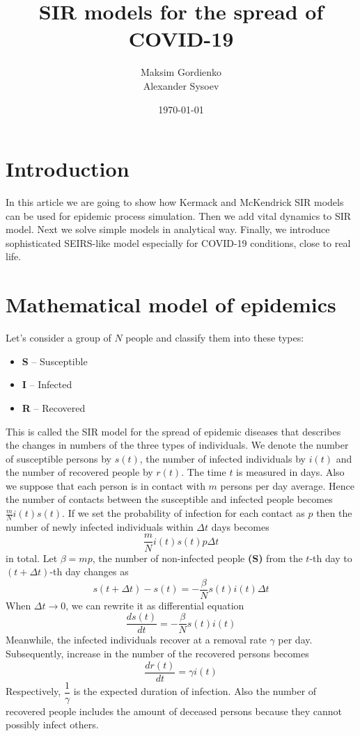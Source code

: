 \documentclass[12pt, a4paper]{article}
\title{SIR models for the spread of COVID-19}
\date{\today}
\author{
	Maksim Gordienko \\
	Alexander Sysoev
}
\begin{document}
	\maketitle
	
	\section{Introduction}
	In this article we are going to show how Kermack and McKendrick SIR models can be used for epidemic process simulation. Then we add vital dynamics to SIR model. Next we solve simple models in analytical way. Finally, we introduce sophisticated SEIRS-like model especially for COVID-19 conditions, close to real life.
	
	\section{Mathematical model of epidemics}
	Let's consider a group of $N$ people and classify them into these types:
	\begin{itemize}
		\item \textbf{S} -- Susceptible
		\item \textbf{I} -- Infected
		\item \textbf{R} -- Recovered
	\end{itemize}

	This is called the SIR model for the spread of epidemic diseases that describes the changes in numbers of the three types of individuals. We denote the number of susceptible persons by $s(t)$, the number of infected individuals by $i(t)$ and the number of recovered people by $r(t)$. The time $t$ is measured in days. Also we suppose that each person is in contact with $m$ persons per day average. Hence the number of contacts between the susceptible and infected people becomes $\frac{m}{N} i(t) s(t)$. If we set the probability of infection for each contact as $p$ then the number of newly infected individuals within $\Delta t$ days becomes
	\begin{equation}
		\frac{m}{N} i(t) s(t) p \Delta t
	\end{equation}
	in total. Let $\beta = mp$, the number of non-infected people \textbf{(S)} from the $t$-th day to $ (t + \Delta t) $-th day changes as
	\begin{equation}
		s(t + \Delta t) - s(t) = - \frac{\beta}{N} s(t) i(t) \Delta t
	\end{equation}
	When $\Delta t \rightarrow 0 $, we can rewrite it as differential equation
	\begin{equation}
		\frac{ds(t)}{dt} = - \frac{\beta}{N} s(t) i(t)
	\end{equation}
	Meanwhile, the infected individuals recover at a removal rate $ \gamma $ per day. Subsequently, increase in the number of the recovered persons becomes
	\begin{equation}
		\frac{dr(t)}{dt} = \gamma i(t)
	\end{equation}
	Respectively, $ \dfrac{1}{\gamma} $ is the expected duration of infection. Also the number of recovered people includes the amount of deceased persons because they cannot possibly infect others.
	
\end{document}
